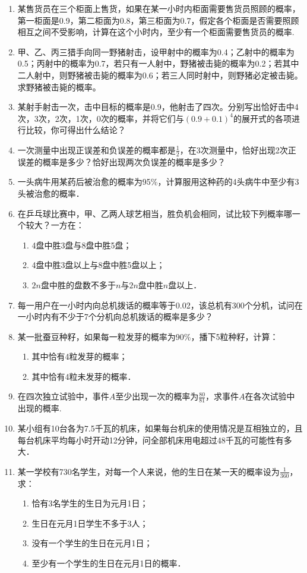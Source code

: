 \begin{enumerate}
\item 某售货员在三个柜面上售货，如果在某一小时内柜面需要售货员照顾的概率，第一柜面是0.9，第二柜面为0.8，第三柜面为0.7，假定各个柜面是否需要照顾相互之间不受影响，计算在这个小时内，至少有一个柜面需要售货员的概率.
\item 甲、乙、丙三猎手向同一野猪射击，设甲射中的概率为0.4；乙射中的概率为0.5；丙射中的概率为0.7，若只有一人射中，野猪被击毙的概率为0.2；若其中二人射中，则野猪被击毙的概率为0.6；若三人同时射中，则野猪必定被击毙。求野猪被击毙的概率。
\item 某射手射击一次，击中目标的概率是0.9，他射击了四次。分别写出恰好击中4次，3次，2次，1次，0次的概率，并将它们与$(0.9+0.1)^4$的展开式的各项进行比较，你可得出什么结论？
\item 一次测量中出现正误差和负误差的概率都是$\frac{1}{2}$，在3次测量中，恰好出现2次正误差的概率是多少？恰好出现两次负误差的概率是多少？
\item 一头病牛用某药后被治愈的概率为95\%，计算服用这种药的4头病牛中至少有3头被治愈的概率．
\item 在乒乓球比赛中，甲、乙两人球艺相当，胜负机会相同，试比较下列概率哪一个较大？一方在：
\begin{enumerate}[(1)]
\item 4盘中胜3盘与8盘中胜5盘；
\item 4盘中胜3盘以上与8盘中胜5盘以上；
\item $2n$盘中胜的盘数不多于$n$与$2n$盘中胜$n$盘以上．
\end{enumerate}

\item 每一用户在一小时内向总机拨话的概率等于0.02，该总机有300个分机，试问在一小时内有不少于7个分机向总机拨话的概率是多少？

\item 某一批蚕豆种籽，如果每一粒发芽的概率为90\%，播下5粒种籽，计算：
\begin{enumerate}[(1)]
    \item 其中恰有4粒发芽的概率；
    \item 其中恰有4粒未发芽的概率．
\end{enumerate}

\item 在四次独立试验中，事件$A$至少出现一次的概率为$\frac{80}{81}$，求事件$A$在各次试验中出现的概率.
\item 某小组有10台各为7.5千瓦的机床，如果每台机床的使用情况是互相独立的，且每台机床平均每小时开动12分钟，问全部机床用电超过48千瓦的可能性有多大．
\item 某一学校有730名学生，对每一个人来说，他的生日在某一天的概率设为$\frac{1}{360}$，求：
\begin{enumerate}[(1)]
\item 恰有3名学生的生日为元月1日；
\item 生日在元月1日学生不多于3人；
\item 没有一个学生的生日在元月1日；
\item 至少有一个学生的生日在元月1日的概率．
\end{enumerate}


\end{enumerate}
